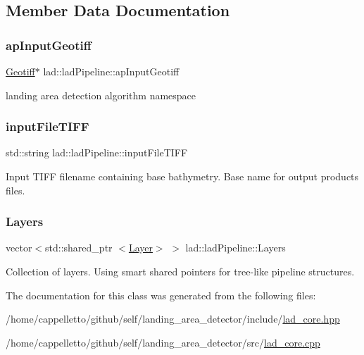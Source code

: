 \subsection{Member Data Documentation}
\mbox{\label{classlad_1_1lad_pipeline_a1ecbd2ad5ac586de2876ee2e59cc1b97}} 
\subsubsection{\texorpdfstring{ap\+Input\+Geotiff}{apInputGeotiff}}
{\footnotesize\ttfamily \hyperlink{class_geotiff}{Geotiff}$\ast$ lad\+::lad\+Pipeline\+::ap\+Input\+Geotiff}



landing area detection algorithm namespace 

\mbox{\label{classlad_1_1lad_pipeline_a2312bba58d0b3b44e72fd6bea4e4b35c}} 
\subsubsection{\texorpdfstring{input\+File\+T\+I\+FF}{inputFileTIFF}}
{\footnotesize\ttfamily std\+::string lad\+::lad\+Pipeline\+::input\+File\+T\+I\+FF}



Input T\+I\+FF filename containing base bathymetry. Base name for output products files. 

\mbox{\label{classlad_1_1lad_pipeline_a7c0702fe312deebd185bd3a3a5a02a53}} 
\subsubsection{\texorpdfstring{Layers}{Layers}}
{\footnotesize\ttfamily vector$<$std\+::shared\+\_\+ptr $<$\hyperlink{classlad_1_1_layer}{Layer}$>$ $>$ lad\+::lad\+Pipeline\+::\+Layers}



Collection of layers. Using smart shared pointers for tree-\/like pipeline structures. 



The documentation for this class was generated from the following files\+:\begin{DoxyCompactItemize}
\item 
/home/cappelletto/github/self/landing\+\_\+area\+\_\+detector/include/\hyperlink{lad__core_8hpp}{lad\+\_\+core.\+hpp}\item 
/home/cappelletto/github/self/landing\+\_\+area\+\_\+detector/src/\hyperlink{lad__core_8cpp}{lad\+\_\+core.\+cpp}\end{DoxyCompactItemize}
